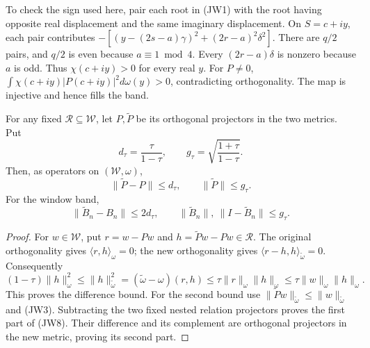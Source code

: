 To check the sign used here, pair each root in (JW1) with the root
having opposite real displacement and the same imaginary displacement.
On \(S=c+iy\), each pair contributes
\(-[(y-(2s-a)\gamma)^2+(2r-a)^2\delta^2]\).
There are \(q/2\) pairs, and \(q/2\) is even because \(a\equiv1\bmod4\).
Every \((2r-a)\delta\) is nonzero because \(a\) is odd.
Thus \(\chi(c+iy)>0\) for every real \(y\).  For \(P\ne0\),
\(\int\chi(c+iy)|P(c+iy)|^2d\omega(y)>0\), contradicting orthogonality.
The map is injective and hence fills the band.

\begin{lemma}
For any fixed \(\mathcal R\subseteq\mathcal W\), let \(P,\widetilde P\)
be its orthogonal projectors in the two metrics.  Put
\[
d_\tau=\frac{\tau}{1-\tau},\qquad
g_\tau=\sqrt{\frac{1+\tau}{1-\tau}}.
\]
Then, as operators on \((\mathcal W,\omega)\),
\[
\|\widetilde P-P\|\le d_\tau,\qquad
\|\widetilde P\|\le g_\tau.
\tag{JW7}
\]
For the window band,
\[
\|\widetilde B_n-B_n\|\le2d_\tau,\qquad
\|\widetilde B_n\|,\ \|I-\widetilde B_n\|\le g_\tau.
\tag{JW8}
\]
\end{lemma}
\begin{proof}
For \(w\in\mathcal W\), put \(r=w-Pw\) and
\(h=\widetilde Pw-Pw\in\mathcal R\).  The original orthogonality gives
\(\langle r,h\rangle_\omega=0\); the new orthogonality gives
\(\langle r-h,h\rangle_{\widetilde\omega}=0\).
Consequently
\[
(1-\tau)\|h\|_\omega^2
\le \|h\|_{\widetilde\omega}^2
= (\widetilde\omega-\omega)(r,h)
\le\tau\|r\|_\omega\|h\|_\omega
\le\tau\|w\|_\omega\|h\|_\omega.
\]
This proves the difference bound.  For the second bound use
\(\|\widetilde Pw\|_{\widetilde\omega}\le
\|w\|_{\widetilde\omega}\) and (JW3).
Subtracting the two fixed nested relation projectors proves the first
part of (JW8).  Their difference and its complement are orthogonal
projectors in the new metric, proving its second part.
\end{proof}

